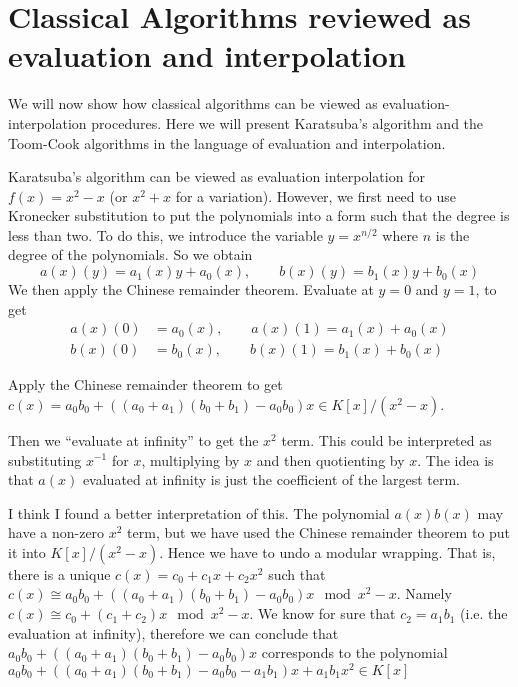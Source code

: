 \section{Classical Algorithms reviewed as evaluation and interpolation}%
\label{sec:classical_algorithms_reviewed_as_evaluation_and_interpolation}

We will now show how classical algorithms can be viewed as evaluation-interpolation procedures. Here we will present Karatsuba's algorithm and the Toom-Cook algorithms in the language of evaluation and interpolation.

Karatsuba's algorithm can be viewed as evaluation interpolation for $f(x) = x^2 - x$ (or $x^2 + x$ for a variation). However, we first need to use Kronecker substitution to put the polynomials into a form such that the degree is less than two. To do this, we introduce the variable $y = x^{n/2}$ where $n$ is the degree of the polynomials. So we obtain
\[
    a(x)(y) = a_1(x)y + a_0(x), \qquad b(x)(y) = b_1(x)y + b_0(x)
\]
We then apply the Chinese remainder theorem. Evaluate at $y = 0$ and $y = 1$, to get
\begin{align*}
    a(x)(0) &= a_0(x), \qquad a(x)(1) = a_1(x) + a_0(x)\\
    b(x)(0) &= b_0(x), \qquad b(x)(1) = b_1(x) + b_0(x)
\end{align*}

Apply the Chinese remainder theorem to get $c(x) = a_0b_0 + ((a_0 + a_1)(b_0 + b_1) - a_0b_0)x \in K[x]/(x^2 - x)$. 

Then we ``evaluate at infinity'' to get the $x^2$ term. This could be interpreted as substituting $x^{-1}$ for $x$, multiplying by $x$ and then quotienting by $x$. The idea is that $a(x)$ evaluated at infinity is just the coefficient of the largest term. 

I think I found a better interpretation of this. The polynomial $a(x)b(x)$ may have a non-zero $x^2$ term, but we have used the Chinese remainder theorem to put it into $K[x] / (x^2 - x)$. Hence we have to undo a modular wrapping. That is, there is a unique $c(x) = c_0 + c_1x + c_2x^2$ such that $c(x) \cong a_0b_0 + ((a_0 + a_1)(b_0 + b_1) - a_0b_0)x \mod x^2 - x$. Namely $c(x) \cong c_0 + (c_1 + c_2)x \mod x^2 - x$. We know for sure that $c_2 = a_1b_1$ (i.e. the evaluation at infinity), therefore we can conclude that $a_0b_0 + ((a_0 + a_1)(b_0 + b_1) - a_0b_0)x$ corresponds to the polynomial $a_0b_0 + ((a_0 + a_1)(b_0 + b_1) - a_0b_0 - a_1b_1)x + a_1b_1x^2 \in K[x]$

